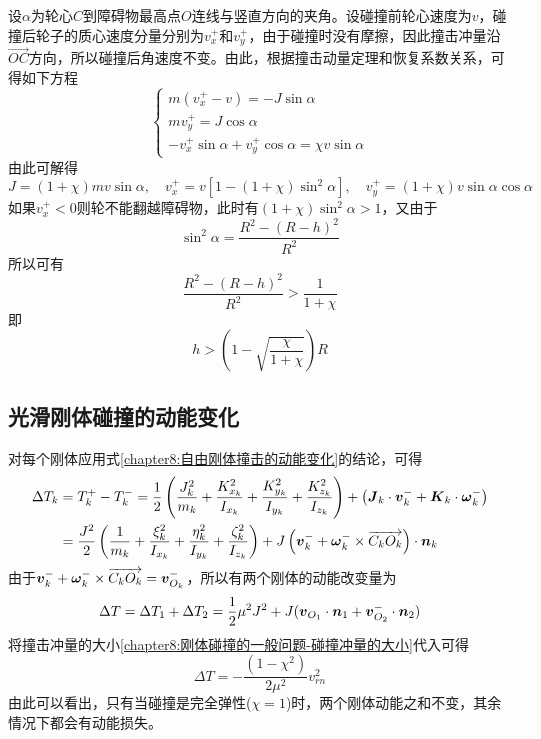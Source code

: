 \begin{solution}
设$\alpha$为轮心$C$到障碍物最高点$O$连线与竖直方向的夹角。设碰撞前轮心速度为$v$，碰撞后轮子的质心速度分量分别为$v_x^+$和$v_y^+$，由于碰撞时没有摩擦，因此撞击冲量沿$\vec{OC}$方向，所以碰撞后角速度不变。由此，根据撞击动量定理和恢复系数关系，可得如下方程
\begin{equation*}
\begin{cases}
	m(v_x^+-v)=-J\sin\alpha \\
	mv_y^+=J\cos\alpha \\
	-v_x^+\sin\alpha+v_y^+\cos\alpha=\chi v\sin\alpha
\end{cases}
\end{equation*}
由此可解得
\begin{equation*}
	J = (1+\chi)mv\sin\alpha,\quad v_x^+=v\left[1-(1+\chi)\sin^2\alpha\right],\quad v_y^+=(1+\chi)v\sin\alpha\cos\alpha
\end{equation*}
如果$v_x^+<0$则轮不能翻越障碍物，此时有$(1+\chi)\sin^2\alpha>1$，又由于
\begin{equation*}
	\sin^2\alpha = \frac{R^2-(R-h)^2}{R^2}
\end{equation*}
所以可有
\begin{equation*}
	\frac{R^2-(R-h)^2}{R^2} > \frac{1}{1+\chi}
\end{equation*}
即
\begin{equation*}
	h>\left(1-\sqrt{\frac{\chi}{1+\chi}}\right)R
\end{equation*}
\end{solution}

\subsection{光滑刚体碰撞的动能变化}

对每个刚体应用式\eqref{chapter8:自由刚体撞击的动能变化}的结论，可得
\begin{align*}
	\Delta T_k & = T_k^+-T_k^- = \frac12 \left(\frac{J_k^2}{m_k} + \frac{K_{x_k}^2}{I_{x_k}} + \frac{K_{y_k}^2}{I_{y_k}} + \frac{K_{z_k}^2}{I_{z_k}}\right) + \left(\boldsymbol{J}_k\cdot \boldsymbol{v}_k^-+\boldsymbol{K}_k\cdot \boldsymbol{\omega}_k^-\right) \\
	& = \frac{J^2}{2}\left(\frac{1}{m_k} + \frac{\xi_k^2}{I_{x_k}} + \frac{\eta_k^2}{I_{y_k}} + \frac{\zeta_k^2}{I_{z_k}}\right) + J\left(\boldsymbol{v}_k^-+\boldsymbol{\omega}_k^-\times \overrightarrow{C_kO_k}\right) \cdot \boldsymbol{n}_k
\end{align*}
由于$\boldsymbol{v}_k^-+\boldsymbol{\omega}_k^-\times \overrightarrow{C_kO_k} = \boldsymbol{v}_{O_k}^-$，所以有两个刚体的动能改变量为
\begin{equation*}
	\Delta T = \Delta T_1+\Delta T_2 = \frac12 \mu^2J^2+J(\boldsymbol{v}_{O_1}\cdot \boldsymbol{n}_1 + \boldsymbol{v}_{O_2}^-\cdot \boldsymbol{n}_2)
\end{equation*}
将撞击冲量的大小\eqref{chapter8:刚体碰撞的一般问题-碰撞冲量的大小}代入可得
\begin{equation}
	\Delta T = -\frac{(1-\chi^2)}{2\mu^2}v_{rn}^2
	\label{chapter8:光滑刚体碰撞的动能变化式}
\end{equation}
由此可以看出，只有当碰撞是完全弹性($\chi=1$)时，两个刚体动能之和不变，其余情况下都会有动能损失。


